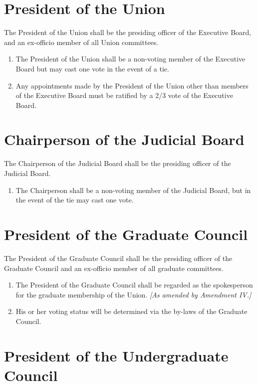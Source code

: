 \documentclass{uniondoc}
\begin{document}
\section{President of the Union}

The President of the Union shall be the presiding officer of the Executive Board, and an ex-officio member of all Union committees.

\begin{enumerate}
	\item The President of the Union shall be a non-voting member of the Executive Board but may cast one vote in the event of a tie.
	\item Any appointments made by the President of the Union other than members of the Executive Board must be ratified by a 2/3 vote of the Executive Board.
\end{enumerate}

\section{Chairperson of the Judicial Board}

The Chairperson of the Judicial Board shall be the presiding officer of the Judicial Board.

\begin{enumerate}
	\item The Chairperson shall be a non-voting member of the Judicial Board, but in the event of the tie may cast one vote.
\end{enumerate}

\section{President of the Graduate Council}

The President of the Graduate Council shall be the presiding officer of the Graduate Council and an ex-officio member of all graduate committees.

\begin{enumerate}
	\item The President of the Graduate Council shall be regarded as the spokesperson for the graduate membership of the Union. \textit{[As amended by Amendment IV.]}
	\item His or her voting status will be determined via the by-laws of the Graduate Council.
\end{enumerate}

\section{President of the Undergraduate Council}
\end{document}
